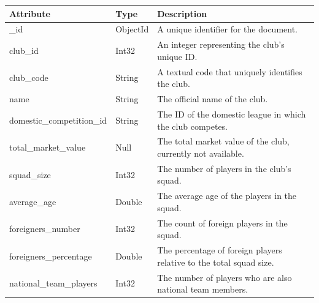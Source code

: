 \documentclass{Configuration_Files/PoliMi3i_thesis}
\begin{document}
    \begin{tabular}{|l|l|p{8cm}|}
    \hline
    \textbf{Attribute}              & \textbf{Type}           & \textbf{Description}                                                                 \\ \hline
    \_id                            & ObjectId                & A unique identifier for the document.                                                               \\ \hline
    club\_id                        & Int32                   & An integer representing the club's unique ID.                                                      \\ \hline
    club\_code                      & String                  & A textual code that uniquely identifies the club.                                                  \\ \hline
    name                            & String                  & The official name of the club.                                                                     \\ \hline
    domestic\_competition\_id       & String                  & The ID of the domestic league in which the club competes.                                           \\ \hline
    total\_market\_value            & Null                    & The total market value of the club, currently not available.                                        \\ \hline
    squad\_size                     & Int32                   & The number of players in the club's squad.                                                         \\ \hline
    average\_age                    & Double                  & The average age of the players in the squad.                                                       \\ \hline
    foreigners\_number              & Int32                   & The count of foreign players in the squad.                                                         \\ \hline
    foreigners\_percentage          & Double                  & The percentage of foreign players relative to the total squad size.                                \\ \hline
    national\_team\_players         & Int32                   & The number of players who are also national team members.                                          \\ \hline

\end{tabular}
\end{document}
